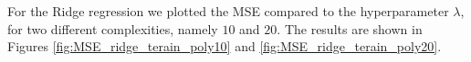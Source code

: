 \documentclass[norsk,a4paper,12pt]{article}
\begin{document}
\begin{multicols}{2}

For the Ridge regression we plotted the MSE compared to the hyperparameter $\lambda$, for two different complexities, namely $10$ and $20$. The results are shown in Figures \ref{fig:MSE_ridge_terain_poly10} and \ref{fig:MSE_ridge_terain_poly20}. 


\end{multicols}
\end{document}
